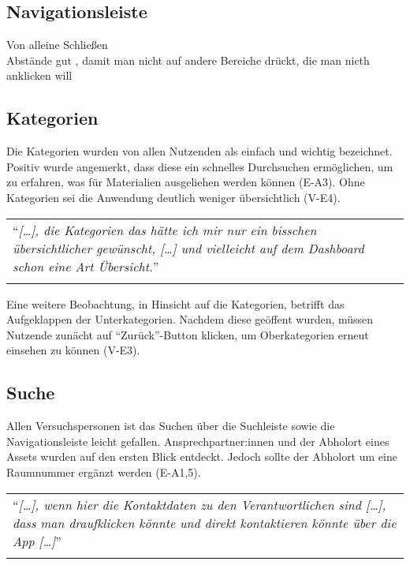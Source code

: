 



\subsection{Navigationsleiste}
Von alleine Schließen\\
Abstände gut , damit man nicht auf andere Bereiche drückt, die man nicth anklicken will


\subsection{Kategorien}
Die Kategorien wurden von allen Nutzenden als einfach und wichtig bezeichnet.
Positiv wurde angemerkt, dass diese ein schnelles Durchsuchen ermöglichen, um zu
erfahren, was für Materialien ausgeliehen werden können (E-A3). Ohne Kategorien
sei die Anwendung deutlich weniger übersichtlich (V-E4).

\begin{longtable}{p{}} \arrayrulecolor{maincolor}\hline
  \enquote{\textit{[\dots], die Kategorien das hätte ich mir nur ein bisschen
      übersichtlicher gewünscht, [\dots] und vielleicht auf dem Dashboard schon eine
  Art Übersicht.}} \\
  \arrayrulecolor{maincolor}\hline
\end{longtable}

Eine weitere Beobachtung, in Hinsicht auf die Kategorien, betrifft das
Aufgeklappen der Unterkategorien. Nachdem diese geöffent wurden, müssen Nutzende
zunächt auf \enquote{Zurück}-Button klicken, um Oberkategorien erneut einsehen zu können
(V-E3).



\subsection{Suche}
Allen Versuchspersonen ist das Suchen über die Suchleiste sowie die Navigationsleiste leicht
gefallen. Ansprechpartner:innen und der Abholort eines Assets wurden auf den ersten Blick entdeckt.
Jedoch sollte der Abholort um eine Raumnummer ergänzt werden (E-A1,5).
\begin{longtable}{p{}} \arrayrulecolor{maincolor}\hline
  \enquote{\textit{[\dots], wenn hier die Kontaktdaten zu den Verantwortlichen
      sind [\dots], dass man draufklicken könnte und direkt kontaktieren könnte
  über die App [\dots]}} \\
  \arrayrulecolor{maincolor}\hline
\end{longtable}

